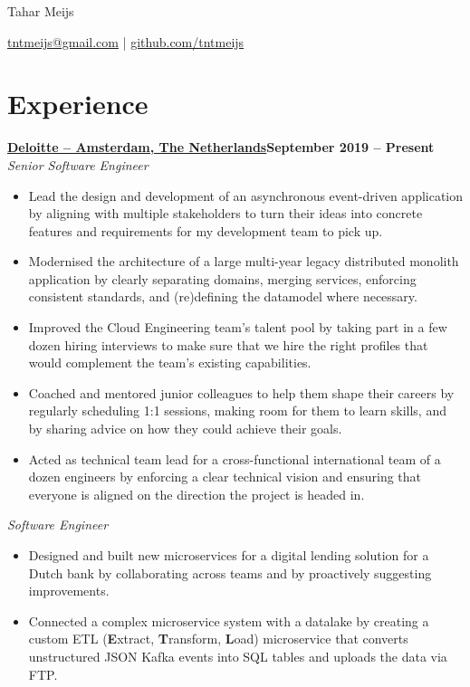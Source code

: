 \documentclass[11pt]{article}       %
\begin{document}
\centerline{\Huge Tahar Meijs}

\vspace{5pt}

\centerline{\href{mailto:tntmeijs@gmail.com}{tntmeijs@gmail.com} | \href{https://github.com/tntmeijs}{github.com/tntmeijs}}

\section*{Experience}
\textbf{\href{https://www.deloitte.com/nl/nl.html}{Deloitte -- Amsterdam, The Netherlands}\hfill September 2019 -- Present} \\
\textit{Senior Software Engineer} \\
\vspace{-9pt}
\begin{itemize}
  \item Lead the design and development of an asynchronous event-driven application by aligning with multiple stakeholders to turn their ideas into concrete features and requirements for my development team to pick up.
  \item Modernised the architecture of a large multi-year legacy distributed monolith application by clearly separating domains, merging services, enforcing consistent standards, and (re)defining the datamodel where necessary.
  \item Improved the Cloud Engineering team's talent pool by taking part in a few dozen hiring interviews to make sure that we hire the right profiles that would complement the team's existing capabilities.
  \item Coached and mentored junior colleagues to help them shape their careers by regularly scheduling 1:1 sessions, making room for them to learn skills, and by sharing advice on how they could achieve their goals.
  \item Acted as technical team lead for a cross-functional international team of a dozen engineers by enforcing a clear technical vision and ensuring that everyone is aligned on the direction the project is headed in.
\end{itemize}

\textit{Software Engineer} \\
\vspace{-9pt}
\begin{itemize}
  \item Designed and built new microservices for a digital lending solution for a Dutch bank by collaborating across teams and by proactively suggesting improvements.
  \item Connected a complex microservice system with a datalake by creating a custom ETL (\textbf{E}xtract, \textbf{T}ransform, \textbf{L}oad) microservice that converts unstructured JSON Kafka events into SQL tables and uploads the data via FTP.
\end{itemize}
\end{document}
